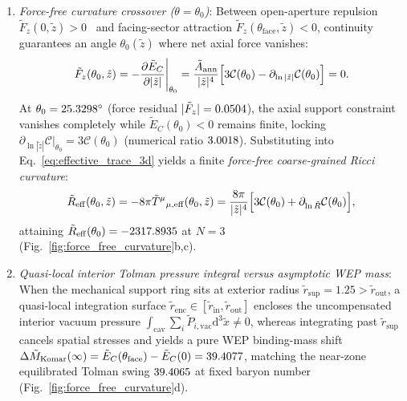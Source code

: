 \documentclass[aps,prd,twocolumn,10pt,showkeys,nofootinbib,floatfix,longbibliography]{revtex4-2}
\newcommand{\dd}{\mathrm{d}}
\begin{document}
\begin{enumerate}
\item \emph{Force-free curvature crossover ($\theta = \theta_0$)}: Between open-aperture repulsion $\tilde{F}_z(0, \tilde{z}) > 0$~\cite{levin2010} and facing-sector attraction $\tilde{F}_z(\theta_{\mathrm{face}}, \tilde{z}) < 0$, continuity guarantees an angle $\theta_0(\tilde{z})$ where net axial force vanishes:
\begin{equation}
\tilde{F}_z(\theta_0, \tilde{z}) = -\frac{\partial \tilde{E}_C}{\partial |\tilde{z}|}\Bigg|_{\theta_0} = \frac{\tilde{A}_{\mathrm{ann}}}{|\tilde{z}|^4}\Bigl[3\mathcal{C}(\theta_0) - \partial_{\ln|\tilde{z}|}\mathcal{C}(\theta_0)\Bigr] = 0.
\label{eq:force_free_condition}
\end{equation}
At $\theta_0 = 25.3298^\circ$ (force residual $|\tilde{F}_z| = 0.0504$), the axial support constraint vanishes completely while $\tilde{E}_C(\theta_0) < 0$ remains finite, locking $\partial_{\ln|\tilde{z}|}\mathcal{C}|_{\theta_0} = 3\mathcal{C}(\theta_0)$ (numerical ratio $3.0018$). Substituting into Eq.~\eqref{eq:effective_trace_3d} yields a finite \emph{force-free coarse-grained Ricci curvature}:
\begin{equation}
\tilde{R}_{\mathrm{eff}}(\theta_0, \tilde{z}) = -8\pi\tilde{T}^\mu{}_{\mu,\mathrm{eff}}(\theta_0, \tilde{z}) = \frac{8\pi}{|\tilde{z}|^4}\Bigl[3\mathcal{C}(\theta_0) + \partial_{\ln\tilde{R}}\mathcal{C}(\theta_0)\Bigr],
\label{eq:ricci_force_free}
\end{equation}
attaining $\tilde{R}_{\mathrm{eff}}(\theta_0) = -2317.8935$ at $N=3$ (Fig.~\ref{fig:force_free_curvature}b,c).

\item \emph{Quasi-local interior Tolman pressure integral versus asymptotic WEP mass}: When the mechanical support ring sits at exterior radius $\tilde{r}_{\mathrm{sup}} = 1.25 > \tilde{r}_{\mathrm{out}}$, a quasi-local integration surface $\tilde{r}_{\mathrm{enc}} \in [\tilde{r}_{\mathrm{in}}, \tilde{r}_{\mathrm{out}}]$ encloses the uncompensated interior vacuum pressure $\int_{\mathrm{cav}}\sum_i \tilde{P}_{i,\mathrm{vac}}\dd^3\tilde{x} \neq 0$, whereas integrating past $\tilde{r}_{\mathrm{sup}}$ cancels spatial stresses and yields a pure WEP binding-mass shift $\Delta\tilde{M}_{\mathrm{Komar}}(\infty) = \tilde{E}_C(\theta_{\mathrm{face}}) - \tilde{E}_C(0) = 39.4077$, matching the near-zone equilibrated Tolman swing $39.4065$ at fixed baryon number (Fig.~\ref{fig:force_free_curvature}d).
\end{enumerate}
\end{document}
